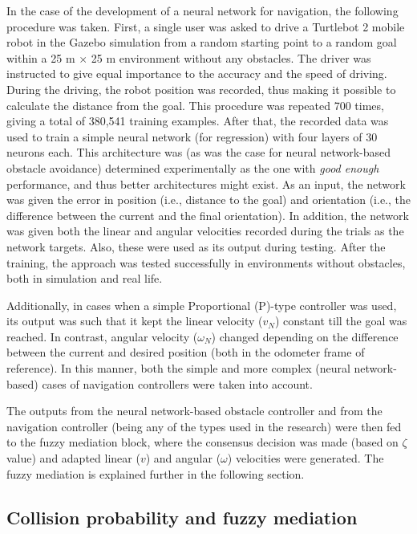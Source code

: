 In the case of the development of a neural network for navigation, the following procedure was taken. First, a single user was asked to drive a Turtlebot 2 mobile robot in the Gazebo simulation from a random starting point to a random goal within a 25 m $\times$ 25 m environment without any obstacles. The driver was instructed to give equal importance to the accuracy and the speed of driving. During the driving, the robot position was recorded, thus making it possible to calculate the distance from the goal. This procedure was repeated 700 times, giving a total of 380,541 training examples. After that, the recorded data was used to train a simple neural network (for regression) with four layers of 30 neurons each. This architecture was (as was the case for neural network-based obstacle avoidance) determined experimentally as the one with \emph{good enough} performance, and thus better architectures might exist. As an input, the network was given the error in position (i.e., distance to the goal) and orientation (i.e., the difference between the current and the final orientation). In addition, the network was given both the linear and angular velocities recorded during the trials as the network targets. Also, these were used as its output during testing. After the training, the approach was tested successfully in environments without obstacles, both in simulation and real life. 

Additionally, in cases when a simple Proportional (P)-type controller was used, its output was such that it kept the linear velocity ($v_N$) constant till the goal was reached. In contrast, angular velocity ($\omega_N$) changed depending on the difference between the current and desired position (both in the odometer frame of reference). In this manner, both the simple and more complex (neural network-based) cases of navigation controllers were taken into account.

The outputs from the neural network-based obstacle controller and from the navigation controller (being any of the types used in the research) were then fed to the fuzzy mediation block, where the consensus decision was made (based on $\zeta$ value) and adapted linear ($v$) and angular ($\omega$) velocities were generated. The fuzzy mediation is explained further in the following section.

\subsection{Collision probability and fuzzy mediation}

